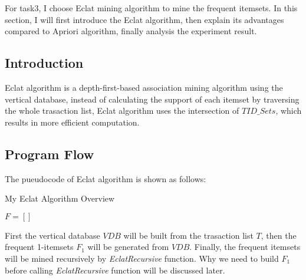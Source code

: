 \documentclass[a4paper, oneside, final, 12pt]{scrartcl} %
\begin{document}
For task3, I choose Eclat mining algorithm to mine the frequent itemsets.
In this section, I will first introduce the Eclat algorithm,
then explain its advantages compared to Apriori algorithm,
finally analysis the experiment result.

\subsection{Introduction}

Eclat algorithm\cite{zaki1997new}\cite{borgelt2012frequent} is a depth-first-based association mining algorithm 
using the vertical database, instead of calculating the support of each itemset by
traversing the whole trasaction list, Eclat algorithm uses the intersection of $TID\_Sets$,
which results in more efficient computation. \\

\subsection{Program Flow}

The pueudocode of Eclat algorithm is shown as follows:

\begin{algorithm}
  \caption{My Eclat Algorithm Overview}

  \BlankLine
  $F = []$ \\
\end{algorithm}

First the vertical database $VDB$ will be built from the trasaction list $T$,
then the frequent 1-itemsets $F_1$ will be generated from $VDB$.
Finally, the frequent itemsets will be mined recursively by \emph{EclatRecursive} function.
Why we need to build $F_1$ before calling \emph{EclatRecursive} function will be discussed later.\\
\end{document}
